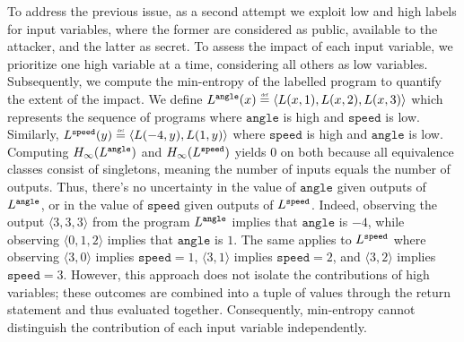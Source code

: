 To address the previous issue, as a second attempt we exploit low and high labels for input variables, where the former are considered as public, available to the attacker, and the latter as secret.
To assess the impact of each input variable, we prioritize one high variable at a time, considering all others as low variables.
Subsequently, we compute the min-entropy of the labelled program to quantify the extent of the impact.
%
%
We define $\landingprogram^{\texttt{angle}}(x)\defeq \langle\landingprogram(x, 1), \landingprogram(x, 2), \landingprogram(x, 3)\rangle$ which represents the sequence of programs where ${\texttt{angle}}$ is high and ${\texttt{speed}}$ is low.
%
Similarly, $\landingprogram^{\texttt{speed}}(y)\defeq\langle\landingprogram(-4, y), \landingprogram(1, y)\rangle$ where ${\texttt{speed}}$ is high and ${\texttt{angle}}$ is low.
%
Computing ${H_\infty}(L^{\texttt{angle}})$ and ${H_\infty}(L^{\texttt{speed}})$ yields 0 on both because all equivalence classes consist of singletons, meaning the number of inputs equals the number of outputs. Thus, there's no uncertainty in the value of ${\texttt{angle}}$ given outputs of $L^{\texttt{angle}}$, or in the value of ${\texttt{speed}}$ given outputs of $L^{\texttt{speed}}$.
Indeed, observing the output $\langle 3, 3, 3\rangle$ from the program $L^{\texttt{angle}}$ implies that ${\texttt{angle}}$ is $-4$, while observing $\langle 0, 1, 2 \rangle$ implies that ${\texttt{angle}}$ is $1$. The same applies to $L^{\texttt{speed}}$ where observing $\langle 3, 0 \rangle$ implies ${\texttt{speed}}=1$, $\langle 3, 1\rangle$ implies ${\texttt{speed}}=2$, and $\langle 3, 2\rangle$ implies ${\texttt{speed}}=3$.
%
However, this approach does not isolate the contributions of high variables; these outcomes are combined into a tuple of values through the return statement and thus evaluated together. Consequently, min-entropy cannot distinguish the contribution of each input variable independently.

